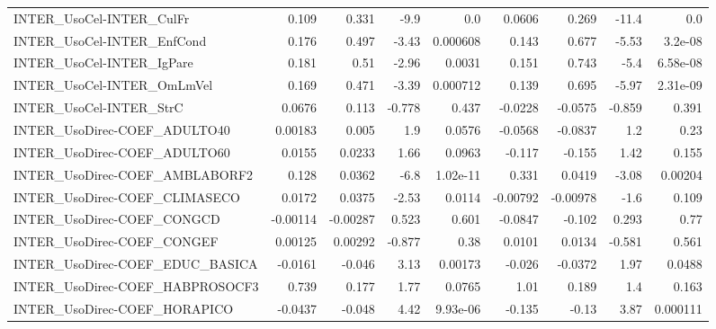 \begin{tabular}{lrrrrrrrr}
INTER\_UsoCel-INTER\_CulFr               &       0.109 &        0.331 &    -9.9 &      0.0 &     0.0606 &       0.269 &        -11.4 &           0.0 \\
INTER\_UsoCel-INTER\_EnfCond             &       0.176 &        0.497 &   -3.43 & 0.000608 &      0.143 &       0.677 &        -5.53 &       3.2e-08 \\
INTER\_UsoCel-INTER\_IgPare              &       0.181 &         0.51 &   -2.96 &   0.0031 &      0.151 &       0.743 &         -5.4 &      6.58e-08 \\
INTER\_UsoCel-INTER\_OmLmVel             &       0.169 &        0.471 &   -3.39 & 0.000712 &      0.139 &       0.695 &        -5.97 &      2.31e-09 \\
INTER\_UsoCel-INTER\_StrC                &      0.0676 &        0.113 &  -0.778 &    0.437 &    -0.0228 &     -0.0575 &       -0.859 &         0.391 \\
INTER\_UsoDirec-COEF\_ADULTO40           &     0.00183 &        0.005 &     1.9 &   0.0576 &    -0.0568 &     -0.0837 &          1.2 &          0.23 \\
INTER\_UsoDirec-COEF\_ADULTO60           &      0.0155 &       0.0233 &    1.66 &   0.0963 &     -0.117 &      -0.155 &         1.42 &         0.155 \\
INTER\_UsoDirec-COEF\_AMBLABORF2         &       0.128 &       0.0362 &    -6.8 & 1.02e-11 &      0.331 &      0.0419 &        -3.08 &       0.00204 \\
INTER\_UsoDirec-COEF\_CLIMASECO          &      0.0172 &       0.0375 &   -2.53 &   0.0114 &   -0.00792 &    -0.00978 &         -1.6 &         0.109 \\
INTER\_UsoDirec-COEF\_CONGCD             &    -0.00114 &     -0.00287 &   0.523 &    0.601 &    -0.0847 &      -0.102 &        0.293 &          0.77 \\
INTER\_UsoDirec-COEF\_CONGEF             &     0.00125 &      0.00292 &  -0.877 &     0.38 &     0.0101 &      0.0134 &       -0.581 &         0.561 \\
INTER\_UsoDirec-COEF\_EDUC\_BASICA        &     -0.0161 &       -0.046 &    3.13 &  0.00173 &     -0.026 &     -0.0372 &         1.97 &        0.0488 \\
INTER\_UsoDirec-COEF\_HABPROSOCF3        &       0.739 &        0.177 &    1.77 &   0.0765 &       1.01 &       0.189 &          1.4 &         0.163 \\
INTER\_UsoDirec-COEF\_HORAPICO           &     -0.0437 &       -0.048 &    4.42 & 9.93e-06 &     -0.135 &       -0.13 &         3.87 &      0.000111 \\

\end{tabular}
